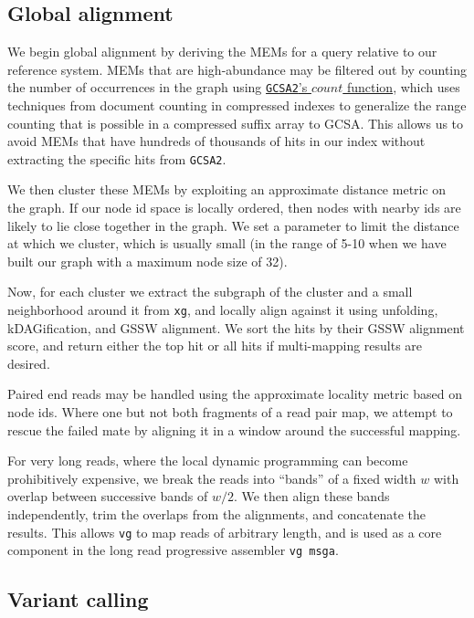 \documentclass{article}
\begin{document}
\subsection{Global alignment}

We begin global alignment by deriving the MEMs for a query relative to our reference system.
MEMs that are high-abundance may be filtered out by counting the number of occurrences in the graph using \href{https://github.com/jltsiren/gcsa2/releases/tag/v0.6}{{\tt GCSA2}'s $count$ function}, which uses techniques from document counting in compressed indexes to generalize the range counting that is possible in a compressed suffix array to GCSA.
This allows us to avoid MEMs that have hundreds of thousands of hits in our index without extracting the specific hits from {\tt GCSA2}.

We then cluster these MEMs by exploiting an approximate distance metric on the graph.
If our node id space is locally ordered, then nodes with nearby ids are likely to lie close together in the graph.
We set a parameter to limit the distance at which we cluster, which is usually small (in the range of 5-10 when we have built our graph with a maximum node size of 32).

Now, for each cluster we extract the subgraph of the cluster and a small neighborhood around it from {\tt xg}, and locally align against it using unfolding, kDAGification, and GSSW alignment.
We sort the hits by their GSSW alignment score, and return either the top hit or all hits if multi-mapping results are desired.

Paired end reads may be handled using the approximate locality metric based on node ids.
Where one but not both fragments of a read pair map, we attempt to rescue the failed mate by aligning it in a window around the successful mapping.

For very long reads, where the local dynamic programming can become prohibitively expensive, we break the reads into ``bands'' of a fixed width $w$ with overlap between successive bands of $w/2$.
We then align these bands independently, trim the overlaps from the alignments, and concatenate the results.
This allows {\tt vg} to map reads of arbitrary length, and is used as a core component in the long read progressive assembler {\tt vg msga}.

\subsection{Variant calling}
\end{document}
